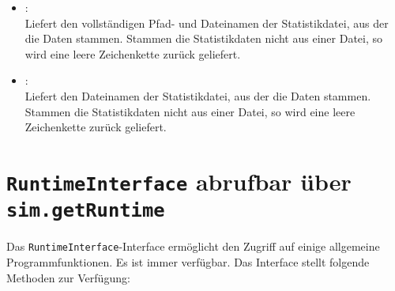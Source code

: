 \begin{itemize}

\item
{}:\\
Liefert den vollständigen Pfad- und Dateinamen der Statistikdatei, aus der die Daten stammen.
Stammen die Statistikdaten nicht aus einer Datei, so wird eine leere Zeichenkette zurück geliefert.

\item
{}:\\
Liefert den Dateinamen der Statistikdatei, aus der die Daten stammen.
Stammen die Statistikdaten nicht aus einer Datei, so wird eine leere Zeichenkette zurück geliefert.

\end{itemize}



\chapter{\texttt{RuntimeInterface} abrufbar über \texttt{sim.getRuntime}}

Das \texttt{RuntimeInterface}-Interface ermöglicht den Zugriff auf einige allgemeine Programmfunktionen.
Es ist immer verfügbar. Das Interface stellt folgende Methoden zur Verfügung:

